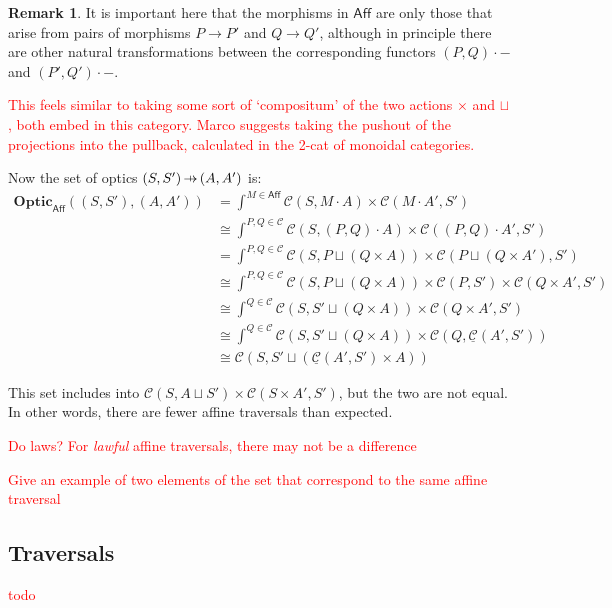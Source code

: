 \documentclass[11pt,a4paper]{article}
\theoremstyle{plain}
\theoremstyle{definition}
\newtheorem{remark}[theorem]{Remark}
\newcommand{\C}{\mathscr{C}}
\newcommand{\homC}{\underline{\C}}
\newcommand{\Optic}{\mathbf{Optic}}
\newcommand{\hto}{\ensuremath{\,\mathaccent\shortmid\rightarrow\,}}
\newcommand{\todo}[1]{\textcolor{red}{\small #1}}
\begin{document}
\begin{remark}
  It is important here that the morphisms in $\mathsf{Aff}$ are only those that arise from pairs of morphisms $P \to P'$ and $Q \to Q'$, although in principle there are other natural transformations between the corresponding functors $(P, Q) \cdot -$ and $(P', Q') \cdot -$.
\end{remark}

\todo{This feels similar to taking some sort of `compositum' of the two actions $\times$ and $\sqcup$, both embed in this category. Marco suggests taking the pushout of the projections into the pullback, calculated in the 2-cat of monoidal categories.}

Now the set of optics $(S, S') \hto (A, A')$ is:
\begin{align*}
  \Optic_{\mathsf{Aff}}((S, S'), (A, A'))
  &= \int^{M \in \mathsf{Aff}} \C(S, M \cdot A) \times \C(M \cdot A', S') \\
  &\cong \int^{P,Q \in \C} \C(S, (P,Q) \cdot A) \times \C((P,Q) \cdot A', S') \\
  &= \int^{P,Q \in \C} \C(S, P \sqcup (Q \times A)) \times \C(P \sqcup (Q \times A'), S') \\
  &\cong \int^{P,Q \in \C} \C(S, P \sqcup (Q \times A)) \times \C(P,S') \times \C(Q \times A', S') \\
  &\cong \int^{Q \in \C} \C(S, S' \sqcup (Q \times A)) \times \C(Q \times A', S') \\
  &\cong \int^{Q \in \C} \C(S, S' \sqcup (Q \times A)) \times \C(Q, \homC(A', S')) \\
  &\cong \C(S, S' \sqcup (\homC(A', S') \times A))
\end{align*}

This set includes into $\C(S, A \sqcup S') \times \C(S\times A', S')$, but the two are not equal. In other words, there are fewer affine traversals than expected.

\todo{Do laws? For \emph{lawful} affine traversals, there may not be a difference}

\todo{Give an example of two elements of the set that correspond to the same affine traversal}

\subsection{Traversals}
\todo{todo}
\end{document}
